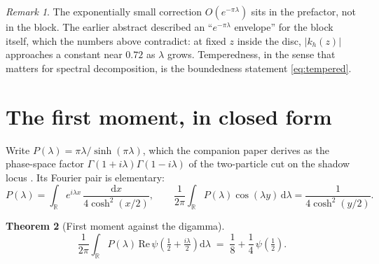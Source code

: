 \documentclass[12pt,a4paper]{article}
\theoremstyle{plain}
\newtheorem{theorem}{Theorem}[section]
\theoremstyle{definition}
\theoremstyle{remark}
\newtheorem{remark}[theorem]{Remark}
\newcommand{\R}{\mathbb{R}}
\newcommand{\dd}{\mathrm{d}}
\begin{document}
\begin{remark}
The exponentially small correction $O(e^{-\pi\lambda})$ sits in the
prefactor, not in the block. The earlier abstract described an
``$e^{-\pi\lambda}$ envelope'' for the block itself, which the numbers
above contradict: at fixed $z$ inside the disc, $|k_h(z)|$ approaches a
constant near $0.72$ as $\lambda$ grows. Temperedness, in the sense
that matters for spectral decomposition, is the boundedness statement
\eqref{eq:tempered}.
\end{remark}

\section{The first moment, in closed form}

Write $P(\lambda)=\pi\lambda/\sinh(\pi\lambda)$, which the companion
paper derives as the phase-space factor
$\Gamma(1+i\lambda)\Gamma(1-i\lambda)$ of the two-particle cut on the
shadow locus \cite{ToupinLoops}. Its Fourier pair is elementary:
\begin{equation}
P(\lambda)=\int_\R e^{i\lambda x}\,\frac{\dd x}{4\cosh^2(x/2)},
\qquad
\frac{1}{2\pi}\int_\R P(\lambda)\cos(\lambda y)\,\dd\lambda
=\frac{1}{4\cosh^2(y/2)} .
\label{eq:fourier}
\end{equation}

\begin{theorem}[First moment against the digamma]
\label{thm:moment}
\begin{equation}
\frac{1}{2\pi}\int_\R P(\lambda)\,
\mathrm{Re}\,\psi\!\left(\tfrac12+\tfrac{i\lambda}{2}\right)\dd\lambda
\;=\;\frac18+\frac14\,\psi\!\left(\tfrac12\right).
\label{eq:moment}
\end{equation}
\end{theorem}
\end{document}
